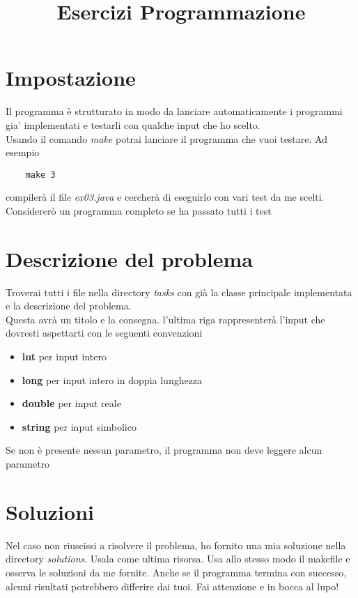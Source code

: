 \documentclass{article}
\begin{document}
\title{Esercizi Programmazione}
\maketitle

\section*{Impostazione}
Il programma è strutturato in modo da lanciare automaticamente i programmi gia'
implementati e testarli con qualche input che ho scelto. \\
Usando il comando \textit{make} potrai lanciare il programma che vuoi testare.
Ad esempio
\begin{verbatim}
    make 3
\end{verbatim}
compilerà il file \textit{ex03.java} e cercherà di eseguirlo con vari test da
me scelti. Considererò un programma completo se ha passato tutti i test \\

\section*{Descrizione del problema}
Troverai tutti i file nella directory \textit{tasks} con già la classe
principale implementata e la descrizione del problema. \\
Questa avrà un titolo e la consegna. l'ultima riga rappresenterà l'input che
dovresti aspettarti con le seguenti convenzioni
\begin{itemize}
    \item \textbf{int} per input intero
    \item \textbf{long} per input intero in doppia lunghezza
    \item \textbf{double} per input reale
    \item \textbf{string} per input simbolico
\end{itemize}
Se non è presente nessun parametro, il programma non deve leggere alcun parametro

\section*{Soluzioni}
Nel caso non riuscissi a risolvere il problema, ho fornito una mia soluzione
nella directory \textit{solutions}. Usala come ultima risorsa. Usa allo stesso
modo il makefile e osserva le soluzioni da me fornite. Anche se il programma
termina con successo, alcuni risultati potrebbero differire dai tuoi.
Fai attenzione e in bocca al lupo!
\end{document}

